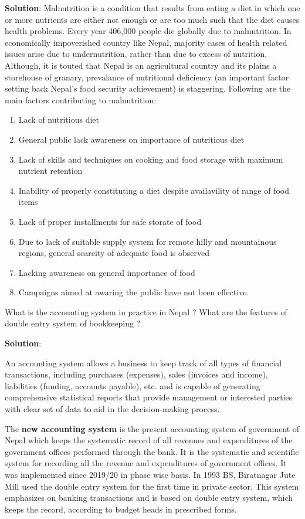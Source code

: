 \documentclass[
  openany]{book}
\newcommand{\question}{\item}
\newenvironment{solution}{ {\bfseries Solution}:}{}
\begin{document}
\begin{questions}
\begin{solution}
Malnutrition is a condition that results from eating a diet in which one or more nutrients are either not enough or are too much such that the diet causes health problems. Every year 406,000 people die globally due to malnutrition. In economically impoverished country like Nepal, majority cases of health related issues arise due to undernutrition, rather than due to excess of nutrition. Although, it is touted that Nepal is an agricultural country and its plains a storehouse of granary, prevalance of nutritional deficiency (an important factor setting back Nepal's food security achievement) is staggering. Following are the main factors contributing to malnutrition:

\begin{enumerate}
\item Lack of nutritious diet
\item General public lack awareness on importance of nutritious diet
\item Lack of skills and techniques on cooking and food storage with maximum nutrient retention
\item Inability of properly constituting a diet despite availavility of range of food items
\item Lack of proper installments for safe storate of food
\item Due to lack of suitable supply system for remote hilly and mountainous regions, general scarcity of adequate food is observed
\item Lacking awareness on general importance of food
\item Campaigns aimed at awaring the public have not been effective.
\end{enumerate}
\end{solution}

\question What is the accounting system in practice in Nepal ? What are the features of double entry system of bookkeeping ?

\begin{solution}

An accounting system allows a business to keep track of all types of financial transactions, including purchases (expenses), sales (invoices and income), liabilities (funding, accounts payable), etc. and is capable of generating comprehensive statistical reports that provide management or interested parties with clear set of data to aid in the decision-making process.

The \textbf{new accounting system} is the present accounting system of government of Nepal which keeps the systematic record of all revenues and expenditures of the government offices performed through the bank. It is the systematic and scientific system for recording all the revenue and expenditures of government offices. It was implemented since 2019/20 in phase wise basis. In 1993 BS, Biratnagar Jute Mill used the double entry system for the first time in private sector. This system emphasizes on banking transactions and is based on double entry system, which keeps the record, according to budget heads in prescribed forms.


\end{solution}
\end{questions}
\end{document}
